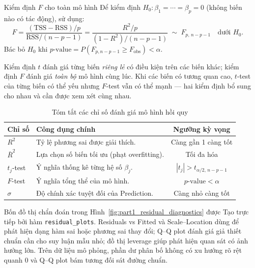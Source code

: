 \begin{mythm}{Kiểm định $F$ cho toàn mô hình}{}
Để kiểm định $H_0 : \beta_1 = \cdots = \beta_p = 0$ (không biến nào có tác động),
sử dụng:
\[
    F = \frac{(\mathrm{TSS} - \mathrm{RSS})/p}{\mathrm{RSS}/(n - p - 1)}
    = \frac{R^2/p}{(1 - R^2)/(n - p - 1)}
    \;\sim\; F_{p,\,n-p-1}
    \quad \text{dưới } H_0.
\]
Bác bỏ $H_0$ khi $p\text{-value} = P(F_{p,n-p-1} \geq F_{\mathrm{obs}}) < \alpha$.
\end{mythm}

\begin{note}
Kiểm định $t$ đánh giá từng biến \emph{riêng lẻ} có điều kiện trên các biến khác;
kiểm định $F$ đánh giá \emph{toàn bộ} mô hình cùng lúc. Khi các biến có tương quan
cao, $t$-test của từng biến có thể yếu nhưng $F$-test vẫn có thể mạnh — hai kiểm
định bổ sung cho nhau và cần được xem xét cùng nhau.
\end{note}

\begin{table}[H]
\centering
\caption{Tóm tắt các chỉ số đánh giá mô hình hồi quy}
\label{tab:model_metrics}
\begin{tabular}{llc}
\toprule
\textbf{Chỉ số} & \textbf{Công dụng chính} & \textbf{Ngưỡng kỳ vọng} \\ \midrule
$R^2$
    & Tỷ lệ phương sai được giải thích.
    & Càng gần 1 càng tốt \\
$\bar{R}^2$
    & Lựa chọn số biến tối ưu (phạt overfitting).
    & Tối đa hóa \\
$t_j$-test
    & Ý nghĩa thống kê từng hệ số $\beta_j$.
    & $|t_j| > t_{\alpha/2,\,n-p-1}$ \\
$F$-test
    & Ý nghĩa tổng thể của mô hình.
    & $p\text{-value} < \alpha$ \\
$\hat{\sigma}$
    & Độ chính xác tuyệt đối của Prediction.
    & Càng nhỏ càng tốt \\ \bottomrule
\end{tabular}
\end{table}


Bốn đồ thị chẩn đoán trong Hình~\ref{fig:part1_residual_diagnostics} được Tạo
trực tiếp bởi hàm \texttt{residual\_plots}. Residuals vs Fitted và
Scale--Location dùng để phát hiện dạng hàm sai hoặc phương sai thay đổi; Q--Q
plot đánh giá giả thiết chuẩn cần cho suy luận mẫu nhỏ; đồ thị leverage giúp
phát hiện quan sát có ảnh hưởng lớn. Trên dữ liệu mô phỏng, phần dư phân bố
không có xu hướng rõ rệt quanh 0 và Q--Q plot bám tương đối sát đường chuẩn.

